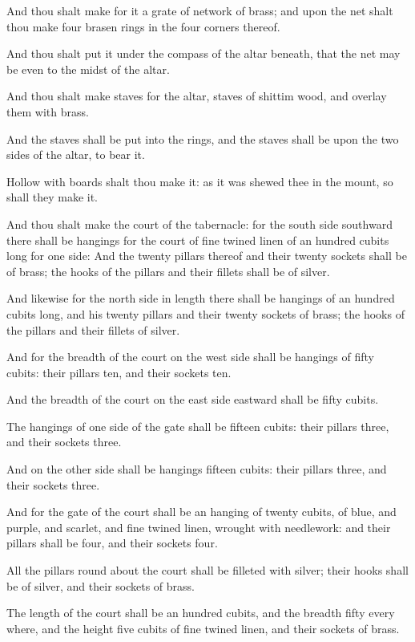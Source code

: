 \verse And thou shalt make for it a grate of network of brass; and upon the net shalt thou make four brasen rings in the four corners thereof.

\verse And thou shalt put it under the compass of the altar beneath, that the net may be even to the midst of the altar.

\verse And thou shalt make staves for the altar, staves of shittim wood, and overlay them with brass.

\verse And the staves shall be put into the rings, and the staves shall be upon the two sides of the altar, to bear it.

\verse Hollow with boards shalt thou make it: as it was shewed thee in the mount, so shall they make it.

\verse And thou shalt make the court of the tabernacle: for the south side southward there shall be hangings for the court of fine twined linen of an hundred cubits long for one side: \verse And the twenty pillars thereof and their twenty sockets shall be of brass; the hooks of the pillars and their fillets shall be of silver.

\verse And likewise for the north side in length there shall be hangings of an hundred cubits long, and his twenty pillars and their twenty sockets of brass; the hooks of the pillars and their fillets of silver.

\verse And for the breadth of the court on the west side shall be hangings of fifty cubits: their pillars ten, and their sockets ten.

\verse And the breadth of the court on the east side eastward shall be fifty cubits.

\verse The hangings of one side of the gate shall be fifteen cubits: their pillars three, and their sockets three.

\verse And on the other side shall be hangings fifteen cubits: their pillars three, and their sockets three.

\verse And for the gate of the court shall be an hanging of twenty cubits, of blue, and purple, and scarlet, and fine twined linen, wrought with needlework: and their pillars shall be four, and their sockets four.

\verse All the pillars round about the court shall be filleted with silver; their hooks shall be of silver, and their sockets of brass.

\verse The length of the court shall be an hundred cubits, and the breadth fifty every where, and the height five cubits of fine twined linen, and their sockets of brass.

